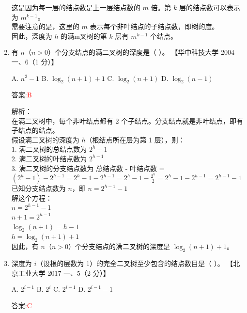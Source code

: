 \documentclass[lang=cn,newtx,10pt,scheme=chinese]{../../../elegantbook}
\begin{document}
\begin{enumerate}
    这是因为每一层的结点数是上一层结点数的 $m$ 倍。第 $k$ 层的结点数可以表示为 $m^{k-1}$。\\
    
    需要注意的是，这里的 $m$ 表示每个非叶结点的子结点数，即树的度。\\
    
    因此，深度为 $h$ 的满m叉树的第 $k$ 层有 $m^{k-1}$ 个结点。\\

    \item 有 $n$（$n > 0$）个分支结点的满二叉树的深度是（ ）。  
    【华中科技大学 2004 一、6（1 分）】  

    A. $n^2 - 1$ \quad B. $\log_2 (n + 1) + 1$ \quad C. $\log_2 (n + 1)$ \quad D. $\log_2 (n - 1)$  

    答案:\textcolor{red}{B}
    
    解析：\\
    在满二叉树中，每个非叶结点都有 2 个子结点。分支结点就是非叶结点，即有子结点的结点。\\
    
    假设满二叉树的深度为 $h$（根结点所在层为第 1 层），则：\\
    1. 满二叉树的总结点数为 $2^h - 1$\\
    2. 满二叉树的叶结点数为 $2^{h-1}$\\
    3. 满二叉树的分支结点数为 总结点数 - 叶结点数 = $(2^h - 1) - 2^{h-1} = 2^h - 1 - 2^{h-1} = 2^h - 1 - \frac{2^h}{2} = 2^h - 1 - 2^{h-1} = 2^{h-1} - 1$\\
    
    已知分支结点数为 $n$，即 $n = 2^{h-1} - 1$\\
    解这个方程：\\
    $n = 2^{h-1} - 1$\\
    $n + 1 = 2^{h-1}$\\
    $\log_2(n + 1) = h - 1$\\
    $h = \log_2(n + 1) + 1$\\
    
    因此，有 $n$（$n > 0$）个分支结点的满二叉树的深度是 $\log_2(n + 1) + 1$。\\

    \item 深度为 $i$（设根的层数为 1）的完全二叉树至少包含的结点数目是（ ）。  
    【北京工业大学 2017 一、5（2 分）】  

    A. $2^{i-1}$ \quad B. $2^i$ \quad C. $2^{i - 1}$ \quad D. $2^{i-1} - 1$  

    答案:\textcolor{red}{C}
    

\end{enumerate}
\end{document}
